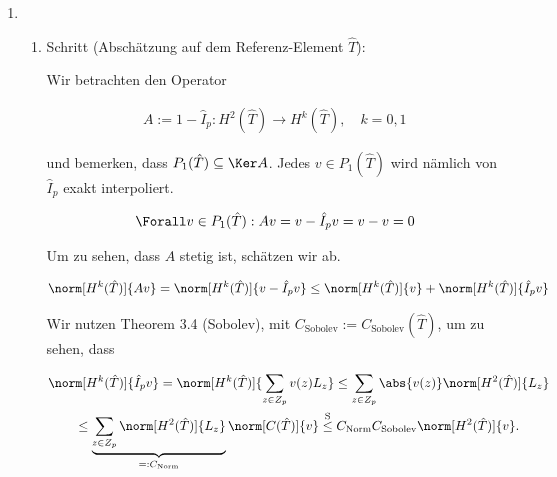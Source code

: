 \begin{solution}
\begin{enumerate}[label = \textbf{\alph*)}]
    \item \phantom{}
  
  
    \begin{enumerate}[label = \arabic*.]
  
      \item Schritt (Abschätzung auf dem Referenz-Element $\hat T$):
  
      Wir betrachten den Operator
  
      \begin{align*}
        A := 1 - \hat I_p:
        H^2(\hat T) \to H^k(\hat T),
        \quad
        k = 0, 1
      \end{align*}
  
      und bemerken, dass $P_1(\hat T) \subseteq \Ker A$.
      Jedes $v \in P_1(\hat T)$ wird nämlich von $\hat I_p$ exakt interpoliert.
  
      \begin{align*}
        \Forall v \in P_1(\hat T):
        A v = v - \hat I_p v = v - v = 0
      \end{align*}
  
      Um zu sehen, dass $A$ stetig ist, schätzen wir ab.
  
      \begin{align*}
        \norm[H^k(\hat T)]{A v}
        =
        \norm[H^k(\hat T)]{v - \hat I_p v}
        \leq
        \norm[H^k(\hat T)]{v}
        +
        \norm[H^k(\hat T)]{\hat I_p v}
      \end{align*}
  
      Wir nutzen Theorem 3.4 (Sobolev), mit $C_\mathrm{Sobolev} := C_\mathrm{Sobolev}(\hat T)$, um zu sehen, dass
  
      \begin{multline*}
        \norm[H^k(\hat T)]{\hat I_p v}
        =
        \norm[H^k(\hat T)]
        {
          \sum_{z \in Z_p}
          v(z) L_z
        }
        \leq
        \sum_{z \in Z_p}
        \abs{v(z)} \norm[H^2(\hat T)]{L_z} \\
        \leq
        \underbrace
        {
          \sum_{z \in Z_p}
          \norm[H^2(\hat T)]{L_z}
        }_{
          =: C_\mathrm{Norm}
        }
        \norm[C(\hat T)]{v}
        \stackrel
        {
          \mathrm{S}
        }{\leq}
        C_\mathrm{Norm}
        C_\mathrm{Sobolev}
        \norm[H^2(\hat T)]{v}.
      \end{multline*}
  

\end{enumerate}
\end{enumerate}
\end{solution}
